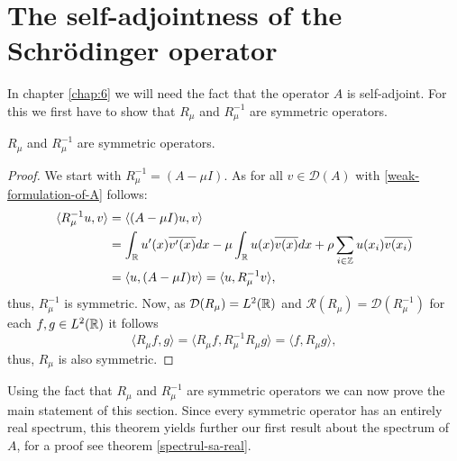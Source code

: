 \section{The self-adjointness of the Schrödinger operator}

In chapter \ref{chap:6} we will need the fact that the operator $A$ is self-adjoint. For this we first have to show that $R_{\mu}$ and $R_{\mu}^{-1}$ are symmetric operators.

\begin{theorem} \label{2.2:thm-RmuSymmetric}
	$R_{\mu}$ and $R_{\mu}^{-1}$ are symmetric operators.
	
	\begin{proof}
		We start with $R_{\mu}^{-1} = (A - \mu I)$. As for all $v \in \mathcal{D}(A)$ with \eqref{weak-formulation-of-A} follows:
			\begin{align*}
				\langle R_{\mu}^{-1} u, v \rangle & = \langle (A - \mu I) u, v \rangle \\
					& = \int_{\mathbb{R}} u'(x) \overline{v'(x)} dx -  \mu \int_{\mathbb{R}} u(x) \overline{v(x)} dx + \rho \sum_{i \in \mathbb{Z}} u(x_{i}) \overline{v(x_{i})} \\
					& = \langle u, (A - \mu I) v \rangle = \langle u,  R_{\mu}^{-1} v \rangle,
			\end{align*}
		thus, $R_{\mu}^{-1}$ is symmetric. Now, as $\mathcal{D}(R_{\mu}) = L^{2}(\mathbb{R})$ and $\mathcal{R}(R_{\mu}) = \mathcal{D}(R_{\mu}^{-1})$ for each $f, g \in L^{2}(\mathbb{R})$ it follows
		\[  \langle R_{\mu} f, g \rangle =  \langle R_{\mu} f, R_{\mu}^{-1} R_{\mu} g \rangle = \langle f, R_{\mu} g \rangle, \]
		thus, $R_{\mu}$ is also symmetric.
	\end{proof}
\end{theorem}

Using the fact that $R_{\mu}$ and $R_{\mu}^{-1}$ are symmetric operators we can now prove the main statement of this section. Since every symmetric operator has an entirely real spectrum, this theorem yields further our first result about the spectrum of $A$, for a proof see theorem \ref{spectrul-sa-real}.

